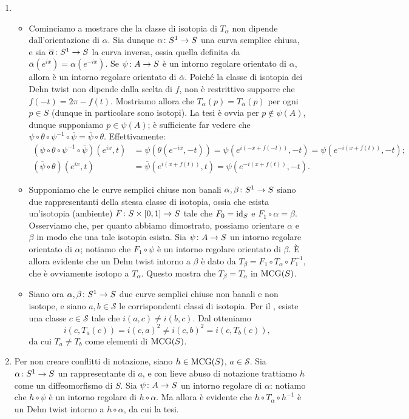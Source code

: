 \begin{enumerate}[(1)]
\item \begin{itemize}
\item Cominciamo a mostrare che la classe di isotopia di $T_\alpha$ non dipende dall'orientazione di $\alpha$. Sia dunque $\map{\alpha}{S^1}{S}$ una curva semplice chiusa, e sia $\map{\overline\alpha}{S^1}{S}$ la curva inversa, ossia quella definita da $\overline\alpha(e^{ix})=\alpha(e^{-ix})$. Se $\map{\psi}{A}{S}$ è un intorno regolare orientato di $\alpha$, allora
è un intorno regolare orientato di $\overline\alpha$. Poiché la classe di isotopia dei Dehn twist non dipende dalla scelta di $f$, non è restrittivo supporre che $f(-t)=2\pi-f(t)$. Mostriamo allora che $T_\alpha(p)=T_{\overline\alpha}(p)$ per ogni $p\in S$ (dunque in particolare sono isotopi). La tesi è ovvia per $p\not\in\psi(A)$, dunque supponiamo $p\in\psi(A)$; è sufficiente far vedere che $\psi\circ\theta\circ\psi^{-1}\circ\overline\psi=\overline\psi\circ\theta$. Effettivamente:
\begin{align*}
(\psi\circ\theta\circ\psi^{-1}\circ\overline\psi)(e^{ix},t)&=\psi(\theta(e^{-ix},-t))=\psi(e^{i(-x+f(-t))},-t)=\psi(e^{-i(x+f(t))},-t);\\
(\overline\psi\circ\theta)(e^{ix},t)&=\overline\psi(e^{i(x+f(t))},t)=\psi(e^{-i(x+f(t))},-t).
\end{align*}
\item Supponiamo che le curve semplici chiuse non banali $\map{\alpha,\beta}{S^1}{S}$ siano due rappresentanti della stessa classe di isotopia, ossia che esista un'isotopia (ambiente) $\map{F}{S\times[0,1]}{S}$ tale che $F_0=\operatorname{id}_S$ e $F_1\circ\alpha=\beta$. Osserviamo che, per quanto abbiamo dimostrato, possiamo orientare $\alpha$ e $\beta$ in modo che una tale isotopia esista. Sia $\map{\psi}{A}{S}$ un intorno regolare orientato di $\alpha$; notiamo che $F_1\circ\psi$ è un intorno regolare orientato di $\beta$. È allora evidente che un Dehn twist intorno a $\beta$ è dato da $T_\beta=F_1\circ T_\alpha\circ F_1^{-1}$, che è ovviamente isotopo a $T_\alpha$. Questo mostra che $T_\beta=T_\alpha$ in $\operatorname{MCG}(S)$.
\item Siano ora $\map{\alpha,\beta}{S^1}{S}$ due curve semplici chiuse non banali e non isotope, e siano $a,b\in\mathcal{S}$ le corrispondenti classi di isotopia. Per il , esiste una classe $c\in\mathcal{S}$ tale che $i(a,c)\neq i(b,c)$. Dal  otteniamo
\[
i(c,T_a(c))=i(c,a)^2\neq i(c,b)^2=i(c,T_b(c)),
\]
da cui $T_a\neq T_b$ come elementi di $\operatorname{MCG}(S)$.
\end{itemize}
\item Per non creare conflitti di notazione, siano $h\in\operatorname{MCG}(S)$, $a\in\mathcal{S}$. Sia $\map{\alpha}{S^1}{S}$ un rappresentante di $a$, e con lieve abuso di notazione trattiamo $h$ come un diffeomorfismo di $S$. Sia $\map{\psi}{A}{S}$ un intorno regolare di $\alpha$: notiamo che $h\circ\psi$ è un intorno regolare di $h\circ\alpha$. Ma allora è evidente che $h\circ T_\alpha\circ h^{-1}$ è un Dehn twist intorno a $h\circ\alpha$, da cui la tesi.
\end{enumerate}


